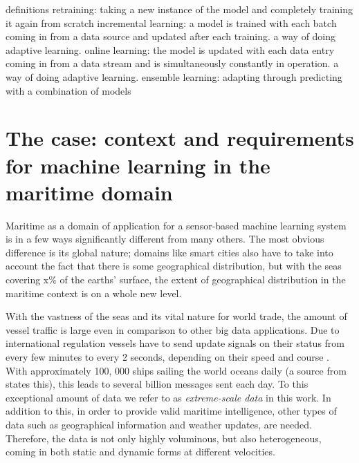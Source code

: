 definitions
 retraining: taking a new instance of the model and completely training it again from scratch
	    incremental learning: a model is trained with each batch coming in from a data source and updated after each training. a way of doing adaptive learning.
	    online learning: the model is updated with each data entry coming in from a data stream and is simultaneously constantly in operation. a way of doing adaptive learning.
	    ensemble learning: adapting through predicting with a combination of models



\section{The case: context and requirements for machine learning in the maritime domain}

Maritime as a domain of application for a sensor-based machine learning system is in a few ways significantly different from many others. The most obvious difference is its global nature; domains like smart cities also have to take into account the fact that there is some geographical distribution, but with the seas covering x\% of the earths' surface, the extent of geographical distribution in the maritime context is on a whole new level.

With the vastness of the seas and its vital nature for world trade, the amount of vessel traffic is large even in comparison to other big data applications. Due to international regulation vessels have to send update signals on their status from every few minutes to every 2 seconds, depending on their speed and course \cite{maritimeinformatics}. With approximately 100, 000 ships sailing the world oceans daily (a source from \cite{maritimeinformatics} states this), this leads to several billion messages sent each day. To this exceptional amount of data we refer to as \textit{extreme-scale data} in this work. In addition to this, in order to provide valid maritime intelligence, other types of data such as geographical information and weather updates, are needed. Therefore, the data is not only highly voluminous, but also heterogeneous, coming in both static and dynamic forms at different velocities.


